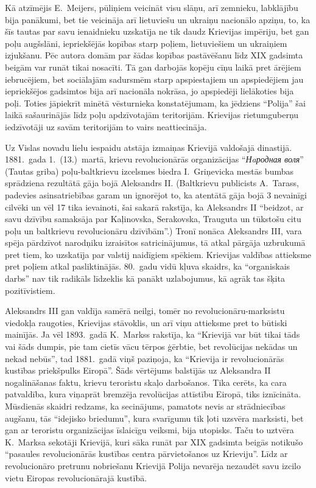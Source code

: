 \documentclass[twoside,a5paper,12pt,fleqn,openany]{extbook}
\newcommand{\pltxti}[1]{\textit{\textpolish{#1}}}
\begin{document}
Kā atzīmējis E.~Meijers, pūliņiem veicināt visu slāņu, arī zemnieku, labklājību bija panākumi, bet tie veicināja arī lietuviešu un ukraiņu nacionālo apziņu, to, ka šīs tautas par savu ienaidnieku uzskatīja ne tik daudz Krievijas impēriju, bet gan poļu augšslāni, iepriekšējās kopības starp poļiem, lietuviešiem un ukraiņiem izjukšanu. Pēc autora domām par šādas kopības pastāvēšanu līdz XIX gadsimta beigām var runāt tikai nosacīti. Tā gan darbojās kopēju cīņu laikā pret ārējiem iebrucējiem, bet sociālajām sadursmēm starp apspiestajiem un apspiedējiem jau iepriekšējos gadsimtos bija arī nacionāla nokrāsa, jo apspiedēji lielākoties bija poļi. Toties jāpiekrīt minētā vēsturnieka konstatējumam, ka jēdziens ``Polija'' šai laikā sašaurinājās līdz poļu apdzīvotajām teritorijām. Krievijas rietumguberņu iedzīvotāji uz savām teritorijām to vairs neattiecināja.

Uz Vislas novadu lielu iespaidu atstāja izmaiņas Krievijā valdošajā dinastijā. 1881.~gada 1.~(13.)~martā, krievu revolucionārās organizācijas ``\pltxti{Нaродная воля}'' (Tautas griba) poļu-baltkrievu izcelsmes biedra I.~Griņevicka mestās bumbas sprādziena rezultātā gāja bojā Aleksandrs II. (Baltkrievu publicists A.~Tarass, padevies asinsatriebības garam un ignorējot to, ka atentātā gāja bojā 3 nevainīgi cilvēki un vēl 17 tika ievainoti, šai sakarā rakstīja, ka Aleksandrs II ``beidzot, ar savu dzīvību samaksāja par Kaļinovska, Serakovska, Trauguta un tūkstošu citu poļu un baltkrievu revolucionāru dzīvībām''.) Tronī nonāca Aleksandrs III, vara spēja pārdzīvot narodņiku izraisītos satricinājumus, tā atkal pārgāja uzbrukumā pret tiem, ko uzskatīja par valstij naidīgiem spēkiem. Krievijas valdības attieksme pret poļiem atkal pasliktinājās. 80.~gadu vidū kļuva skaidrs, ka ``organiskais darbs'' nav tik radikāls līdzeklis kā panākt uzlabojumus, kā agrāk tas šķita pozitīvistiem.

Aleksandrs III gan valdīja samērā neilgi, tomēr no revolucionāru-marksistu viedokļa raugoties, Krievijas stāvoklis, un arī viņu attieksme pret to būtiski mainījās. Ja vēl 1893.~gadā K.~Markss rakstīja, ka ``Krievijā var būt tikai tāds vai šāds dumpis, pie tam cietīs vācu tērpos ģērbtie, bet revolūcijas nekādas un nekad nebūs'', tad 1881.~gadā viņš paziņoja, ka ``Krievija ir revolucionārās kustības priekšpulks Eiropā''. Šāds vērtējums balstījās uz Aleksandra II nogalināšanas faktu, krievu teroristu skaļo darbošanos. Tika cerēts, ka cara patvaldība, kura viņaprāt bremzēja revolūcijas attīstību Eiropā, tiks iznīcināta. Mūsdienās skaidri redzams, ka secinājums, pamatots nevis ar strādniecības augšanu, tās ``idejisko briedumu'', kura svarīgumu tik ļoti uzsvēra marksisti, bet gan ar teroristu organizācijas īslaicīgu veiksmi, bija utopisks. Taču to uztvēra K.~Marksa sekotāji Krievijā, kuri sāka runāt par XIX gadsimta beigās notikušo ``pasaules revolucionārās kustības centra pārvietošanos uz Krieviju''. Līdz ar revolucionāro pretrunu nobriešanu Krievijā Polija nevarēja nezaudēt savu izcilo vietu Eiropas revolucionārajā kustībā.
\end{document}
